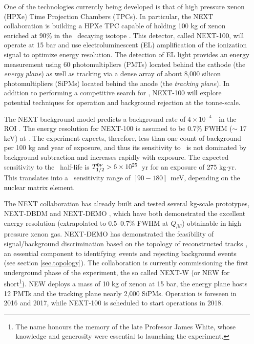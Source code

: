 \documentclass[a4paper,11pt]{article}
\begin{document}
One of the technologies currently being developed is that of high pressure xenon (HPXe) Time Projection Chambers (TPCs). In particular, the NEXT collaboration is building a HPXe TPC capable of 
holding 100 kg of xenon enriched at 90\% in the \bb\ decaying isotope \XE \cite{NEXT_sensitivity}. This detector, called NEXT-100, will operate at 15 bar and use electroluminescent 
(EL) amplification of the ionization signal to optimize energy resolution. The detection of EL light provides an energy measurement using 60 photomultipliers (PMTs) located behind the cathode 
(the \emph{energy plane}) as well as 
tracking via a dense array of about 8,000 silicon photomultipliers (SiPMs) located behind the anode (the \emph{tracking plane}).
In addition to performing a competitive search for \bbonu, NEXT-100 will explore potential techniques for operation and background rejection at the tonne-scale.  

The NEXT background model predicts a background rate of $4 \times 10^{-4}$~\ckky\ in the ROI  \cite{Martin-Albo:2015rhw}. The energy resolution for NEXT-100 is assumed to be 0.7\% FWHM ($\sim$ 17 keV) at \Qbb. The experiment expects, therefore, less than one count of background per 100 kg and year of exposure, and thus its sensitivity to \Tonu\ is not dominated by background subtraction and increases rapidly with exposure. The expected sensitivity to the \bbonu\ half-life is $T_{1/2}^{0\nu} > 6 \times 10^{25}$~yr for an exposure of 275 kg$\cdot$yr. This translates into a \mbb\ sensitivity range of $[90-180]$~meV, depending on the nuclear matrix element.

The NEXT collaboration has already built and tested several kg-scale prototypes, NEXT-DBDM \cite{Alvarez:2012kua} and
NEXT-DEMO \cite{Alvarez:2012xda,Alvarez:2013gxa,Lorca:2014sra}, which have both demonstrated the excellent energy resolution (extrapolated to 0.5--0.7\% FWHM at
$Q_{\beta\beta}$) obtainable in high pressure xenon gas.  NEXT-DEMO has demonstrated the feasibility of signal/background discrimination based on the topology of reconstructed tracks \cite{NEXT_topology},
an essential component to identifying \bbonu\,events and rejecting background events (see section \ref{sec.topology}).  The collaboration is currently commissioning the first underground phase of the experiment, the so called NEXT-W{} (or NEW for short\footnote{The name honours the memory of the late Professor James White, whose knowledge and generosity were essential to launching the experiment.}). NEW deploys a  mass of 10 kg of xenon at 15 bar, the energy plane hosts 12 PMTs and the tracking plane nearly 2,000 SiPMs. Operation is foreseen in 2016 and 2017, while NEXT-100 is scheduled to start operations in 2018.
\end{document}
